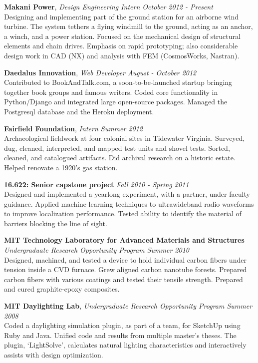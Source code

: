 \documentclass[margin]{res}
\begin{document}
\begin{resume}
 {\bf Makani Power}, \emph{Design Engineering Intern \hfill October 2012 - Present} \\
 Designing and implementing part of the ground station for an airborne wind turbine. The system tethers a flying windmill to the ground, acting as an anchor, a winch, and a power station. Focused on the mechanical design of structural elements and chain drives. Emphasis on rapid prototyping; also considerable design work in CAD (NX) and analysis with FEM (CosmosWorks, Nastran).

 {\bf Daedalus Innovation}, \emph{Web Developer \hfill August - October 2012} \\
 Contributed to BookAndTalk.com, a soon-to-be-launched startup bringing together book groups and famous writers. Coded core functionality in Python/Django and integrated large open-source packages. Managed the Postgresql database and the Heroku deployment.

 {\bf Fairfield Foundation}, 
 \emph{Intern \hfill Summer 2012}\\
Archaeological fieldwork at four colonial sites in Tidewater Virginia. Surveyed, dug, cleaned, interpreted, and mapped test units and shovel tests. Sorted, cleaned, and catalogued artifacts. Did archival research on a historic estate. Helped renovate a 1920's gas station.

 {\bf 16.622: Senior capstone project} \hfill \emph{Fall 2010 - Spring 2011} \\
Designed and implemented a yearlong experiment, with a partner, under faculty guidance. Applied machine learning techniques to ultrawideband radio waveforms to improve localization performance. Tested ability to identify the material of barriers blocking the line of sight. 

 {\bf MIT Technology Laboratory for Advanced Materials and Structures } \\
 \emph{Undergraduate Research Opportunity Program \hfill Summer 2010}\\
Designed, machined, and tested a device to hold individual carbon fibers under tension inside a CVD furnace. Grew aligned carbon nanotube forests. Prepared carbon fibers with various coatings and tested their tensile strength. Prepared and cured graphite-epoxy composites.


 {\bf MIT Daylighting Lab}, \emph{Undergraduate Research Opportunity Program \hfill Summer 2008}\\
Coded a daylighting simulation plugin, as part of a team, for SketchUp using Ruby and Java. Unified code and results from multiple master's theses. The plugin, `LightSolve', calculates natural lighting characteristics and interactively assists with design optimization.



\end{resume}
\end{document}
